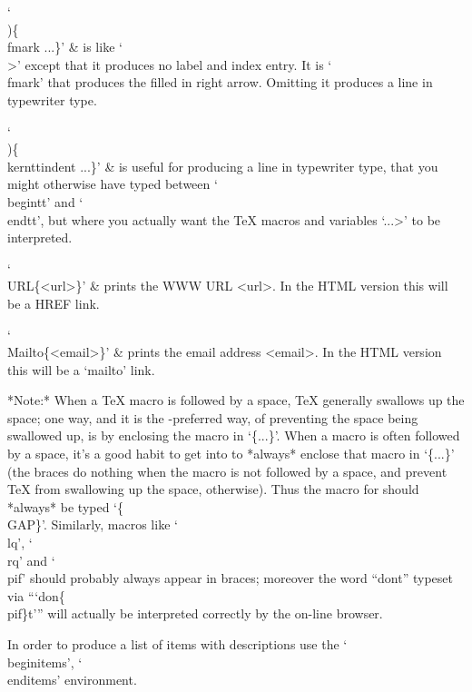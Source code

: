 `\\)\{\\fmark ...\}' &
    is like `\\>' except that it produces no label and index entry. It is
    `\\fmark' that produces  the  filled  in  right  arrow.  Omitting  it
    produces a line in typewriter type.

`\\)\{\\kernttindent ...\}' &
    is useful for producing a line in typewriter  type,  that  you  might
    otherwise have typed between `\\begintt' and `\\endtt', but where you
    actually  want  the  {\TeX}  macros  and  variables  `\<...>'  to  be
    interpreted.

`\\URL\{<url>\}' &
    prints the WWW URL <url>. In the HTML version this will be a HREF link.

`\\Mailto\{<email>\}' &
    prints the email address <email>. In the HTML version this will be  a
    `mailto' link.

\enditems

*Note:*
When a {\TeX} macro is followed by a space, {\TeX} generally swallows  up
the space; one way, and it is the {\GAP}-preferred way, of preventing the
space being swallowed up, is by enclosing the macro in `\{...\}'. When  a
macro is often followed by a space, it's a good  habit  to  get  into  to
*always* enclose that macro in `\{...\}' (the braces do nothing when  the
macro is not followed by a space, and prevent {\TeX} from  swallowing  up
the space, otherwise). Thus the macro for {\GAP} should *always* be typed
`\{\\GAP\}'. Similarly, macros like `\\lq',  `\\rq'  and  `\\pif'  should
probably always  appear  in  braces;  moreover  the  word  ``don{\pif}t''
typeset via ``{`don\{\\pif\}t'}'' will actually be interpreted  correctly
by the on-line browser.


\indextt{\\begintt}\indextt{\\endtt}\indextt{\\beginitems}\indextt{\\enditems}
\indextt{\\item}\indextt{\\itemitem}\indextt{\\beginexample}
\indextt{\\endexample}
In order  to   produce  a  list   of  items with   descriptions  use  the
`\\beginitems', `\\enditems' environment.

